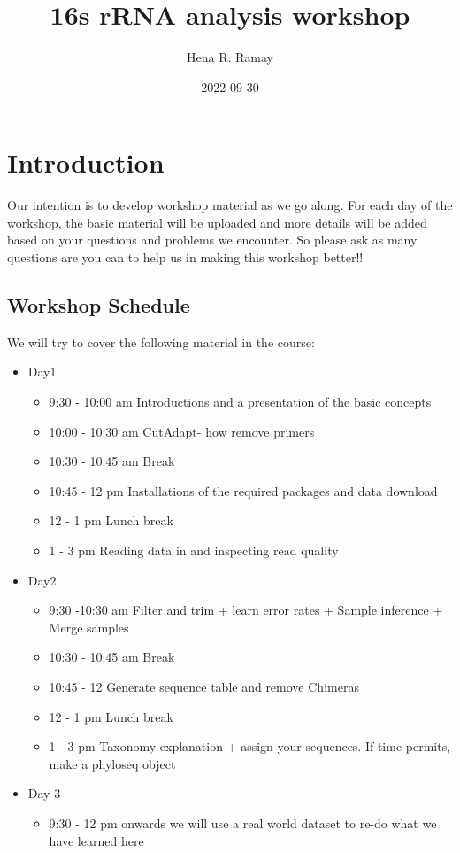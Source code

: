 \documentclass[
]{book}
\title{16s rRNA analysis workshop}
\author{Hena R. Ramay}
\date{2022-09-30}
\providecommand{\tightlist}{%
  \setlength{\itemsep}{0pt}\setlength{\parskip}{0pt}}
\begin{document}
\maketitle

{
\setcounter{tocdepth}{1}
\tableofcontents
}
\hypertarget{introduction}{%
\chapter{Introduction}\label{introduction}}

Our intention is to develop workshop material as we go along. For each day of the workshop, the basic material will be uploaded and more details will be added based on your questions and problems we encounter. So please ask as many questions are you can to help us in making this workshop better!!

\hypertarget{workshop-schedule}{%
\section{Workshop Schedule}\label{workshop-schedule}}

We will try to cover the following material in the course:

\begin{itemize}
\tightlist
\item
  Day1

  \begin{itemize}
  \tightlist
  \item
    9:30 - 10:00 am Introductions and a presentation of the basic concepts
  \item
    10:00 - 10:30 am CutAdapt- how remove primers
  \item
    10:30 - 10:45 am Break
  \item
    10:45 - 12 pm Installations of the required packages and data download
  \item
    12 - 1 pm Lunch break
  \item
    1 - 3 pm Reading data in and inspecting read quality
  \end{itemize}
\item
  Day2

  \begin{itemize}
  \tightlist
  \item
    9:30 -10:30 am Filter and trim + learn error rates + Sample inference + Merge samples
  \item
    10:30 - 10:45 am Break
  \item
    10:45 - 12 Generate sequence table and remove Chimeras
  \item
    12 - 1 pm Lunch break
  \item
    1 - 3 pm Taxonomy explanation + assign your sequences. If time permits, make a phyloseq object
  \end{itemize}
\item
  Day 3

  \begin{itemize}
  \tightlist
  \item
    9:30 - 12 pm onwards we will use a real world dataset to re-do what we have learned here
  \end{itemize}
\end{itemize}
\end{document}
